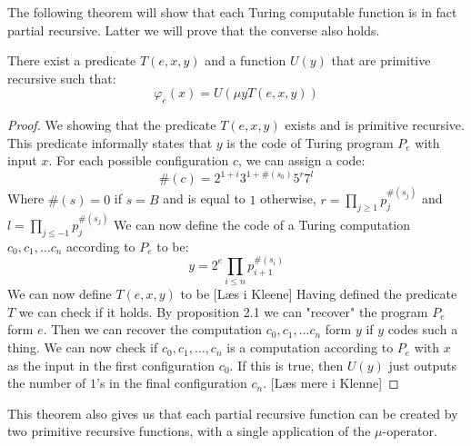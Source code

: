 \documentclass[../main.tex]{subfiles}
\begin{document}
The following theorem will show that each Turing computable function is in fact
partial recursive. Latter we will prove that the converse also holds.

\begin{thm}
	There exist a predicate $T(e,x,y)$ and a function $U(y)$ that are
	primitive recursive such that:
	$$\varphi_e(x)=U(\mu yT(e,x,y))$$
\end{thm}
\begin{proof}
	We showing that the predicate $T(e,x,y)$ exists and is primitive
	recursive. This predicate informally
	states that $y$ is the code of Turing program $P_e$ with input $x$. For
	each possible configuration $c$, we can assign a code:
	$$\#(c)=2^{1+i}3^{1+\#(s_0)}5^r7^l$$
	Where $\#(s)=0$ if $s=B$ and is equal to $1$ otherwise, $r=\prod_{j\geq
	1}p_j^{\#(s_j)}$ and $l=\prod_{j\leq -1}p_j^{\#(s_j)}$
	 We can now define the code of a Turing computation
	$c_0,c_1,\ldots c_n$ according to $P_e$ to be:
	$$y=2^e\prod_{i\leq n}p_{i+1}^{\#(s_i)}$$
	We can now define $T(e,x,y)$ to be [Læs i Kleene]
	Having defined the predicate $T$ we can check if it holds. By
	proposition 2.1 we can "recover" the program $P_e$ form $e$. Then we
	can recover the computation $c_0,c_1,\ldots c_n$ form $y$ if $y$ codes
	such a thing. We can now check if $c_0,c_1,\ldots,c_n$ is a computation
	according to $P_e$ with $x$ as the input in the first configuration
	$c_0$. If this is true, then $U(y)$ just outputs the number of $1$'s in
	the final configuration $c_n$. [Læs mere i Klenne]
\end{proof}
This theorem also gives us that each partial recursive function can be created
by two primitive recursive functions, with a single application of the
$\mu$-operator.
\end{document}
